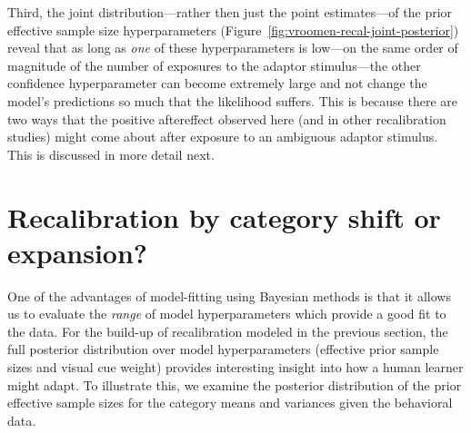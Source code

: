 Third, the joint distribution---rather then just the point estimates---of the prior effective sample size hyperparameters (Figure~\ref{fig:vroomen-recal-joint-posterior}) reveal that as long as \emph{one} of these hyperparameters is low---on the same order of magnitude of the number of exposures to the adaptor stimulus---the other confidence hyperparameter can become extremely large and not change the model's predictions so much that the likelihood suffers.  This is because there are two ways that the positive aftereffect observed here (and in other recalibration studies) might come about after exposure to an ambiguous adaptor stimulus. This is discussed in more detail next.



\section{Recalibration by category shift or expansion?}
\label{sec:recal-categ-shift}

One of the advantages of model-fitting using Bayesian methods is that it allows us to evaluate the {\em range} of model hyperparameters which provide a good fit to the data. For the build-up of recalibration modeled in the previous section, the full posterior distribution over model hyperparameters (effective prior sample sizes and visual cue weight) provides interesting insight into how a human learner might adapt. To illustrate this, we examine the posterior distribution of the prior effective sample sizes for the category means and variances given the behavioral data.

